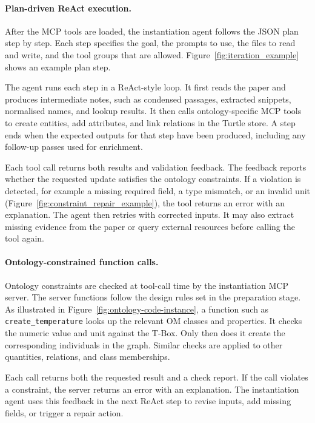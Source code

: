 \paragraph{Plan-driven ReAct execution.}
After the MCP tools are loaded, the instantiation agent follows the JSON plan step by step. Each step specifies the goal, the prompts to use, the files to read and write, and the tool groups that are allowed. Figure~\ref{fig:iteration_example} shows an example plan step.

The agent runs each step in a ReAct-style loop. It first reads the paper and produces intermediate notes, such as condensed passages, extracted snippets, normalised names, and lookup results. It then calls ontology-specific MCP tools to create entities, add attributes, and link relations in the Turtle store. A step ends when the expected outputs for that step have been produced, including any follow-up passes used for enrichment.

Each tool call returns both results and validation feedback. The feedback reports whether the requested update satisfies the ontology constraints. If a violation is detected, for example a missing required field, a type mismatch, or an invalid unit (Figure~\ref{fig:constraint_repair_example}), the tool returns an error with an explanation. The agent then retries with corrected inputs. It may also extract missing evidence from the paper or query external resources before calling the tool again. 


\paragraph{Ontology-constrained function calls.}
Ontology constraints are checked at tool-call time by the instantiation MCP server. The server functions follow the design rules set in the preparation stage. As illustrated in Figure~\ref{fig:ontology-code-instance}, a function such as \texttt{create\_temperature} looks up the relevant OM classes and properties. It checks the numeric value and unit against the T-Box. Only then does it create the corresponding individuals in the graph. Similar checks are applied to other quantities, relations, and class memberships.

Each call returns both the requested result and a check report. If the call violates a constraint, the server returns an error with an explanation. The instantiation agent uses this feedback in the next ReAct step to revise inputs, add missing fields, or trigger a repair action.


